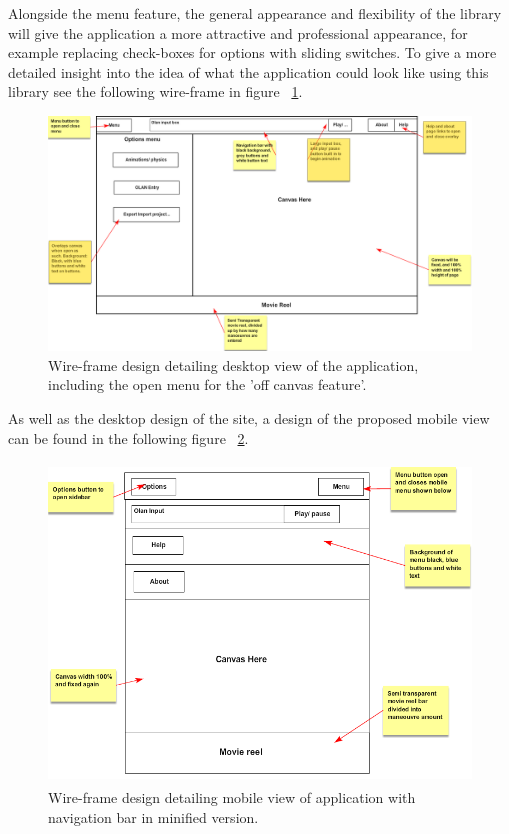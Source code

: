 Alongside the menu feature, the general appearance and flexibility of the library will give the application a more attractive and professional appearance, for example replacing check-boxes for options with sliding switches. To give a more detailed insight into the idea of what the application could look like using this library see the following wire-frame in figure ~\ref{fig:wiredesktop}.

\begin{figure}[h!]
  \centering
      \includegraphics[width=1\textwidth]{images/desktop.png}
  \caption{Wire-frame design detailing desktop view of the application, including the open menu for the 'off canvas feature'.}
  \label{fig:wiredesktop}
\end{figure}

As well as the desktop design of the site, a design of the proposed mobile view can be found in the following figure ~\ref{fig:wiremobile}.

\begin{figure}[h!]
  \centering
      \includegraphics[height=8.5cm]{images/mobile.png}
  \caption{Wire-frame design detailing mobile view of application with navigation bar in minified version.}
  \label{fig:wiremobile}
\end{figure}

